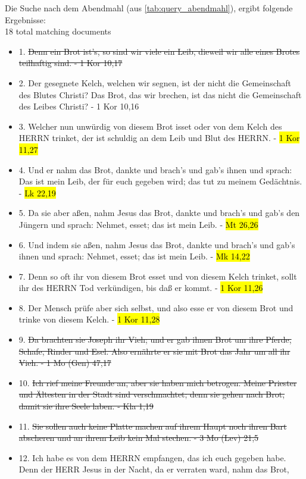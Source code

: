 \label{subsec:index_abendmahl}
Die Suche nach dem Abendmahl (aus \cref{tab:query_abendmahl}), ergibt folgende Ergebnisse:\\
18 total matching documents
\begin{itemize}[noitemsep]
	\item 1.	\st{Denn ein Brot ist's, so sind wir viele ein Leib, dieweil wir alle eines Brotes teilhaftig sind. - 1 Kor 10,17}
	\item 2.	Der gesegnete Kelch, welchen wir segnen, ist der nicht die Gemeinschaft des Blutes Christi? Das Brot, das wir brechen, ist das nicht die Gemeinschaft des Leibes Christi? - 1 Kor 10,16
	\item 3.	Welcher nun unwürdig von diesem Brot isset oder von dem Kelch des HERRN trinket, der ist schuldig an dem Leib und Blut des HERRN. - \hl{1 Kor 11,27}
	\item 4.	Und er nahm das Brot, dankte und brach's und gab's ihnen und sprach: Das ist mein Leib, der für euch gegeben wird; das tut zu meinem Gedächtnis. - \hl{Lk 22,19}
	\item 5.	Da sie aber aßen, nahm Jesus das Brot, dankte und brach's und gab's den Jüngern und sprach: Nehmet, esset; das ist mein Leib. - \hl{Mt 26,26}
	\item 6.	Und indem sie aßen, nahm Jesus das Brot, dankte und brach's und gab's ihnen und sprach: Nehmet, esset; das ist mein Leib. - \hl{Mk 14,22}
	\item 7.	Denn so oft ihr von diesem Brot esset und von diesem Kelch trinket, sollt ihr des HERRN Tod verkündigen, bis daß er kommt. - \hl{1 Kor 11,26}
	\item 8.	Der Mensch prüfe aber sich selbst, und also esse er von diesem Brot und trinke von diesem Kelch. - \hl{1 Kor 11,28}
	\item 9.	\st{Da brachten sie Joseph ihr Vieh; und er gab ihnen Brot um ihre Pferde, Schafe, Rinder und Esel. Also ernährte er sie mit Brot das Jahr um all ihr Vieh. - 1 Mo (Gen) 47,17}
	\item 10.	\st{Ich rief meine Freunde an, aber sie haben mich betrogen. Meine Priester und Ältesten in der Stadt sind verschmachtet; denn sie gehen nach Brot, damit sie ihre Seele laben. - Kla 1,19}
	\item 11.	\st{Sie sollen auch keine Platte machen auf ihrem Haupt noch ihren Bart abscheren und an ihrem Leib kein Mal stechen. - 3 Mo (Lev) 21,5}
	\item 12.	Ich habe es von dem HERRN empfangen, das ich euch gegeben habe. Denn der HERR Jesus in der Nacht, da er verraten ward, nahm das Brot,

\end{itemize}
